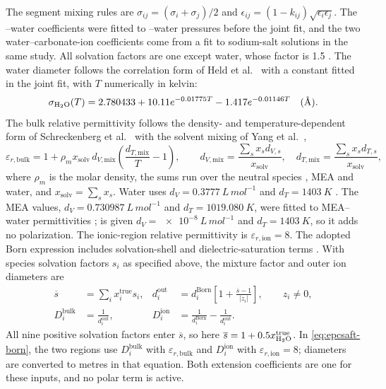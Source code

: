 The segment mixing rules are $\sigma_{ij}=(\sigma_i+\sigma_j)/2$ and $\epsilon_{ij}=(1-k_{ij})\sqrt{\epsilon_i\epsilon_j}$.
The --water coefficients were fitted to --water pressures \cite{kiepeExperimentalDeterminationPrediction2002} before the joint fit, and the two water--carbonate-ion coefficients come from a fit to sodium-salt solutions in the same study.
All solvation factors are one except water, whose factor is 1.5 \cite{Figiel2025}.
The water diameter follows the correlation form of Held et al.\ \cite{Held2008} with a constant fitted in the joint fit, with $T$ numerically in kelvin:
\begin{equation}
 \sigma_{\HtwoO}(T)=2.780433+10.11e^{-0.01775T}-1.417e^{-0.01146T}\quad(\unit{\angstrom}).
\end{equation}
The bulk relative permittivity follows the density- and temperature-dependent form of Schreckenberg et al.\ \cite{Schreckenberg2014} with the solvent mixing of Yang et al.\ \cite{Yang2024},
\begin{equation}
\varepsilon_{r,\mathrm{bulk}}=1+\rho_m x_{\mathrm{solv}}\,d_{V,\mathrm{mix}}\left(\frac{d_{T,\mathrm{mix}}}{T}-1\right),\qquad
d_{V,\mathrm{mix}}=\frac{\sum_{s}x_s d_{V,s}}{x_{\mathrm{solv}}},\quad
d_{T,\mathrm{mix}}=\frac{\sum_{s}x_s d_{T,s}}{x_{\mathrm{solv}}},\label{eq:solvent-permittivity}
\end{equation}
where $\rho_m$ is the molar density, the sums run over the neutral species , MEA and water, and $x_{\mathrm{solv}}=\sum_s x_s$.
Water uses $d_V=\qty{0.3777}{L\,mol^{-1}}$ and $d_T=\qty{1403}{K}$ \cite{Yang2024}.
The MEA values, $d_V=\qty{0.730987}{L\,mol^{-1}}$ and $d_T=\qty{1019.080}{K}$, were fitted to MEA--water permittivities \cite{agieienkoWhatGasStream2024a};  is given $d_V=\qty{e-8}{L\,mol^{-1}}$ and $d_T=\qty{1403}{K}$, so it adds no polarization.
The ionic-region relative permittivity is $\varepsilon_{r,\mathrm{ion}}=8$.
The adopted Born expression includes solvation-shell and dielectric-saturation terms \cite{Figiel2025,Figiel2026Correction}.
With species solvation factors $s_i$ as specified above, the mixture factor and outer ion diameters are
\begin{align}
\overline s&=\sum_i x_i^{\mathrm{true}}s_i,&
d_i^{\mathrm{out}}&=d_i^{\mathrm{Born}}
\left[1+\frac{\overline s-1}{|z_i|}\right],\qquad z_i\ne0,\label{eq:born-shell}\\
D_i^{\mathrm{bulk}}&=\frac{1}{d_i^{\mathrm{out}}},&
D_i^{\mathrm{ion}}&=\frac{1}{d_i^{\mathrm{Born}}}-\frac{1}{d_i^{\mathrm{out}}}.\label{eq:born-diameters}
\end{align}
All nine positive solvation factors enter $\overline s$, so here $\overline s=1+0.5x_{\HtwoO}^{\mathrm{true}}$.
In \cref{eq:epcsaft-born}, the two regions use $D_i^{\mathrm{bulk}}$ with $\varepsilon_{r,\mathrm{bulk}}$ and $D_i^{\mathrm{ion}}$ with $\varepsilon_{r,\mathrm{ion}}=8$; diameters are converted to metres in that equation.
Both extension coefficients are one for these inputs, and no polar term is active.

